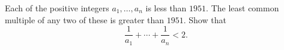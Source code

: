 Each of the positive integers $a_1, \ldots, a_n$ is less than $1951$. The least common multiple of any two of these is greater than $1951$. Show that
\[ \frac{1}{a_1} + \cdots + \frac{1}{a_n} < 2. \]
